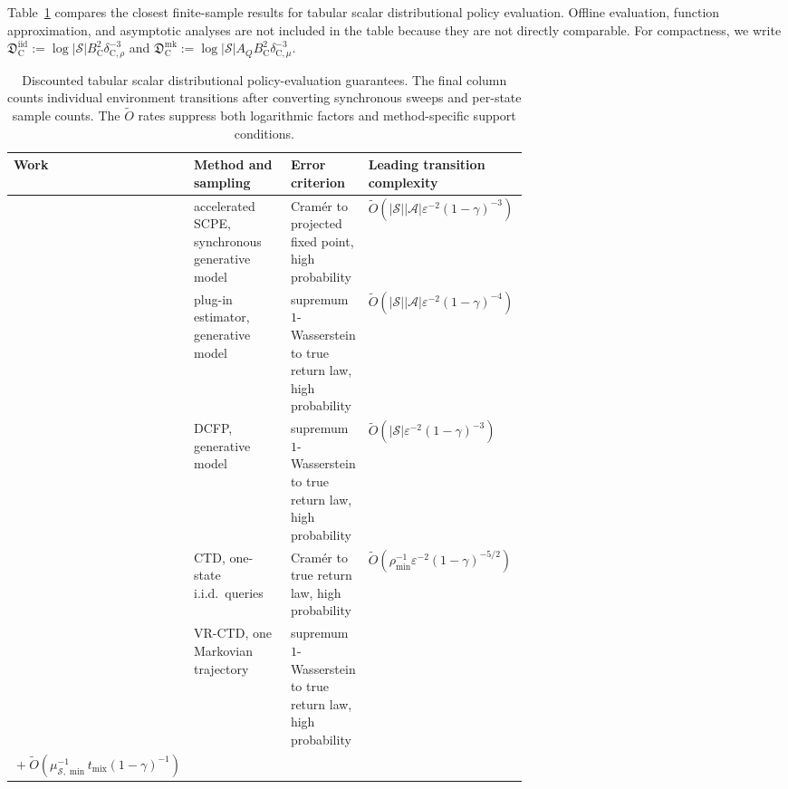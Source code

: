 \documentclass{article}
\newcommand{\X}{\mathcal{S}}
\newcommand{\A}{\mathcal{A}}
\begin{document}
Table~\ref{tab:discounted-comparison} compares the closest finite-sample results for tabular scalar distributional policy evaluation. Offline evaluation, function approximation, and asymptotic analyses are not included in the table because they are not directly comparable. For compactness, we write $\mathfrak D_{\mathrm C}^{\mathrm{iid}}:=\log\lvert\X\rvert B_{\mathrm C}^2\delta_{\mathrm C,\rho}^{-3}$ and $\mathfrak D_{\mathrm C}^{\mathrm{mk}}:=\log\lvert\X\rvert A_QB_{\mathrm C}^2\delta_{\mathrm C,\mu}^{-3}$.
\begin{table}[t]
\centering
\caption{Discounted tabular scalar distributional policy-evaluation guarantees. The final column counts individual environment transitions after converting synchronous sweeps and per-state sample counts. The $\tilde O$ rates suppress both logarithmic factors and method-specific support conditions.}
\label{tab:discounted-comparison}
\scriptsize
\begin{tabularx}{\linewidth}{@{}>{\raggedright\arraybackslash}p{0.16\linewidth}>{\raggedright\arraybackslash}p{0.19\linewidth}>{\raggedright\arraybackslash}X>{\raggedright\arraybackslash}p{0.31\linewidth}@{}}
\toprule
Work & Method and sampling & Error criterion & Leading transition complexity \\
\midrule
\citet{boeck2022speedy} & accelerated SCPE, synchronous generative model & Cram\'er to projected fixed point, high probability & $\tilde O(\lvert\X\rvert\lvert\A\rvert\varepsilon^{-2}(1-\gamma)^{-3})$ \\
\citet{zhang2023estimation} & plug-in estimator, generative model & supremum $1$-Wasserstein to true return law, high probability & $\tilde O(\lvert\X\rvert\lvert\A\rvert\varepsilon^{-2}(1-\gamma)^{-4})$ \\
\citet{rowland2024near} & DCFP, generative model & supremum $1$-Wasserstein to true return law, high probability & $\tilde O(\lvert\X\rvert\varepsilon^{-2}(1-\gamma)^{-3})$ \\
\citet{peng2025statisticalefficiencydistributionaltemporal} & CTD, one-state i.i.d.\ queries & Cram\'er to true return law, high probability & $\tilde O(\rho_{\min}^{-1}\varepsilon^{-2}(1-\gamma)^{-5/2})$ \\
\citet{peng2025statisticalefficiencydistributionaltemporal} & VR-CTD, one Markovian trajectory & supremum $1$-Wasserstein to true return law, high probability & \makecell[l]{$\tilde O\!\left(\mu_{\X,\min}^{-1}\varepsilon^{-2}(1-\gamma)^{-3}\right)$\\${}+\tilde O\left(\mu_{\X,\min}^{-1}t_{\mathrm{mix}}(1-\gamma)^{-1}\right)$} \\

\end{tabularx}
\end{table}
\end{document}
